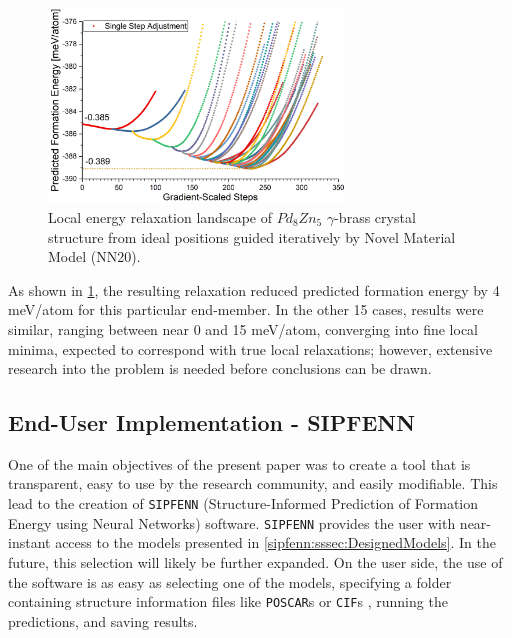\begin{figure}[H]
    \centering
    \includegraphics[width=0.7\textwidth]{sipfenn/localRelaxation_6.png}
    \caption{Local energy relaxation landscape of $Pd_8Zn_5$ $\gamma$-brass crystal structure from ideal positions guided iteratively by Novel Material Model (NN20).}
    \label{sipfenn:fig:localrelaxationpdzn}
\end{figure}

As shown in \ref{sipfenn:fig:localrelaxationpdzn}, the resulting relaxation reduced predicted formation energy by 4 meV/atom for this particular end-member. In the other 15 cases, results were similar, ranging between near 0 and 15 meV/atom, converging into fine local minima, expected to correspond with true local relaxations; however, extensive research into the problem is needed before conclusions can be drawn.


\subsection{End-User Implementation - SIPFENN} \label{sipfenn:ssec:SIPFENN}

One of the main objectives of the present paper was to create a tool that is transparent, easy to use by the research community, and easily modifiable. This lead to the creation of \texttt{SIPFENN} (Structure-Informed Prediction of Formation Energy using Neural Networks) software. \texttt{SIPFENN} provides the user with near-instant access to the models presented in \ref{sipfenn:sssec:DesignedModels}. In the future, this selection will likely be further expanded. On the user side, the use of the software is as easy as selecting one of the models, specifying a folder containing structure information files like \texttt{POSCAR}s \cite{POSCARFile} or \texttt{CIF}s \cite{Hall1991TheCrystallography}, running the predictions, and saving results.

